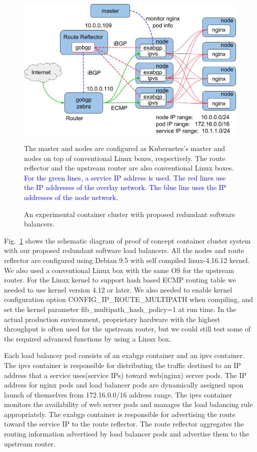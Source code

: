 \begin{figure}[tb]
\begin{center}
\includegraphics[width=\columnwidth]{Figs/poc.png}
\end{center}
\caption{An experimental container cluster with proposed redundant software balancers. }
  The master and nodes are configured as Kubernetes's master and nodes on top of conventional Linux boxes, respectively.
  The route reflector and the upstream router are also conventional Linux boxes.
\textcolor{blue}{
  For the green lines, a service IP address is used. The red lines use the IP addresses of the overlay network. The blue line uses the IP addresses of the node network.
}
\label{fig:poc}
\end{figure}

Fig.~\ref{fig:poc} shows the schematic diagram of proof of concept container cluster system with our proposed redundant software load balancers.
All the nodes and route reflector are configured using Debian 9.5 with self compiled linux-4.16.12 kernel.  
We also used a conventional Linux box with the same OS for the upstream router.
For the Linux kernel to support hash based ECMP routing table we needed to use kernel version 4.12 or later.
We also needed to enable kernel configuration option CONFIG\_IP\_ROUTE\_MULTIPATH\cite{ip-sysctl} when compiling, and set the kernel parameter fib\_multipath\_hash\_policy=1 at run time.
In the actual production environment, proprietary hardware with the highest throughput is often used for the upstream router, but we could still test some of the required advanced functions by using a Linux box.

Each load balancer pod consists of an exabgp container and an ipvs container.
The ipvs container is responsible for distributing the traffic destined to an IP address that a service uses(service IPs) toward web(nginx) server pods.
The IP address for nginx pods and load balancer pods are dynamically assigned upon launch of themselves from 172.16.0.0/16 address range.
The ipvs container monitors the availability of web server pods and manages the load balancing rule appropriately.
The exabgp container is responsible for advertising the route toward the service IP to the route reflector.
The route reflector aggregates the routing information advertised by load balancer pods and advertise them to the upstream router.

